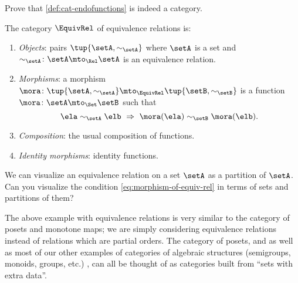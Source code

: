 \begin{exercise}
    Prove that \cref{def:cat-endofunctions} is indeed a category.
\end{exercise}

\begin{solution}
\end{solution}

\begin{ctdefinition}
    \label{def:cat-equivalence-relations}
    The category $\EquivRel$ of equivalence relations is:
    \begin{enumerate}
        \item \emph{Objects}: pairs $\tup{\setA, \sim_{\setA}}$ where $\setA$ is a set and $\sim_{\setA} \colon \setA \mto_{\Rel} \setA$ is an equivalence relation.
        \item \emph{Morphisms}: a morphism $\mora \colon \tup{\setA, \sim_{\setA}} \mto_{\EquivRel} \tup{\setB, \sim_{\setB}}$ is a function $\mora \colon \setA \mto_{\Set} \setB$ such that
              \begin{equation}\label{eq:morphism-of-equiv-rel}
                  \ela \sim_\setA \elb \ \Rightarrow \ \mora(\ela) \sim_\setB \mora(\elb).
              \end{equation}
        \item \emph{Composition}: the usual composition of functions.
        \item \emph{Identity morphisms}: identity functions.
    \end{enumerate}
\end{ctdefinition}

\begin{exercise}
    We can visualize an equivalence relation on a set $\setA$ as a partition of $\setA$.
    Can you visualize the condition \cref{eq:morphism-of-equiv-rel} in terms of sets and partitions of them?
\end{exercise}

\begin{solution}
\end{solution}

\begin{remark}
    The above example with equivalence relations is very similar to the category of posets and monotone maps; we are simply considering equivalence relations instead of relations which are partial orders.
    The category of posets, and as well as most of our other examples of categories of algebraic structures (semigroups, monoids, groups, etc.)
    , can all be thought of as categories built from ``sets with extra data''.
\end{remark}

